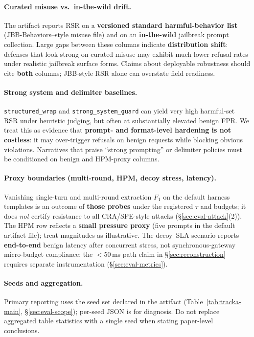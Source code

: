 \documentclass[letterpaper,twocolumn,10pt]{article}
\begin{document}
\paragraph{Curated misuse vs.\ in-the-wild drift.}
The artifact reports RSR on a \textbf{versioned standard harmful-behavior list} (JBB-Behaviors--style misuse file) and on an \textbf{in-the-wild} jailbreak prompt collection. Large gaps between these columns indicate \textbf{distribution shift}: defenses that look strong on curated misuse may exhibit much lower refusal rates under realistic jailbreak surface forms. Claims about deployable robustness should cite \textbf{both} columns; JBB-style RSR alone can overstate field readiness.

\paragraph{Strong system and delimiter baselines.}
\texttt{structured\_wrap} and \texttt{strong\_system\_guard} can yield very high harmful-set RSR under heuristic judging, but often at substantially elevated benign FPR. We treat this as evidence that \textbf{prompt- and format-level hardening is not costless}: it may over-trigger refusals on benign requests while blocking obvious violations. Narratives that praise ``strong prompting'' or delimiter policies must be conditioned on benign and HPM-proxy columns.

\paragraph{Proxy boundaries (multi-round, HPM, decoy stress, latency).}
Vanishing single-turn and multi-round extraction $F_1$ on the default harness templates is an outcome of \textbf{those probes} under the registered $\tau$ and budgets; it does \emph{not} certify resistance to all CRA/SPE-style attacks (\S\ref{sec:eval-attack}(2)). The HPM row reflects a \textbf{small pressure proxy} (five prompts in the default artifact file); treat magnitudes as illustrative. The decoy--SLA scenario reports \textbf{end-to-end} benign latency after concurrent stress, not synchronous-gateway micro-budget compliance; the $<$50\,ms path claim in \S\ref{sec:reconstruction} requires separate instrumentation (\S\ref{sec:eval-metrics}).

\paragraph{Seeds and aggregation.}
Primary reporting uses the seed set declared in the artifact (Table~\ref{tab:tracka-main}, \S\ref{sec:eval-scope}); per-seed JSON is for diagnosis. Do not replace aggregated table statistics with a single seed when stating paper-level conclusions.
\end{document}
